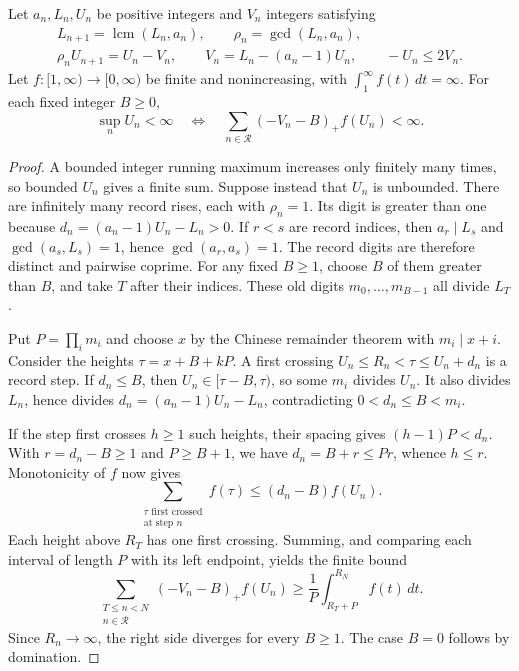 \documentclass[11pt]{article}
\begin{document}
\begin{theorem}\label{long243:res:arithmeticrecord}
Let $a_n,L_n,U_n$ be positive integers and $V_n$ integers satisfying
\[
 \begin{gathered}
 L_{n+1}=\operatorname{lcm}(L_n,a_n),\qquad \rho_n=\gcd(L_n,a_n),\\
 \rho_nU_{n+1}=U_n-V_n,\qquad
 V_n=L_n-(a_n-1)U_n,\qquad -U_n\le2V_n.
 \end{gathered}
\]
Let $f:[1,\infty)\to[0,\infty)$ be finite and nonincreasing, with
$\int_1^\infty f(t)\,dt=\infty$. For each fixed integer $B\ge0$,
\[
 \sup_n U_n<\infty
 \quad\Longleftrightarrow\quad
 \sum_{n\in\mathcal R}(-V_n-B)_+f(U_n)<\infty.
\]
\end{theorem}

\begin{proof}
A bounded integer running maximum increases only finitely many times, so
bounded $U_n$ gives a finite sum. Suppose instead that $U_n$ is unbounded.
There are infinitely many record rises, each with $\rho_n=1$. Its digit is
greater than one because $d_n=(a_n-1)U_n-L_n>0$. If $r<s$ are record
indices, then $a_r\mid L_s$ and $\gcd(a_s,L_s)=1$, hence
$\gcd(a_r,a_s)=1$. The record digits are therefore distinct and pairwise
coprime. For any fixed $B\ge1$, choose $B$ of them greater than $B$,
and take $T$ after their indices. These old digits
$m_0,\ldots,m_{B-1}$ all divide $L_T$.

Put $P=\prod_i m_i$ and choose $x$ by the Chinese remainder theorem with
$m_i\mid x+i$. Consider the heights $\tau=x+B+kP$. A first crossing
$U_n\le R_n<\tau\le U_n+d_n$ is a record step. If $d_n\le B$, then
$U_n\in[\tau-B,\tau)$, so some $m_i$ divides $U_n$. It also divides
$L_n$, hence divides $d_n=(a_n-1)U_n-L_n$, contradicting
$0<d_n\le B<m_i$.

If the step first crosses $h\ge1$ such heights, their spacing gives
$(h-1)P<d_n$. With $r=d_n-B\ge1$ and $P\ge B+1$, we have
$d_n=B+r\le Pr$, whence $h\le r$. Monotonicity of $f$ now gives
\[
 \sum_{\substack{\tau\text{ first crossed}\\\text{at step }n}}f(\tau)
 \le(d_n-B)f(U_n).
\]
Each height above $R_T$ has one first crossing. Summing, and comparing each
interval of length $P$ with its left endpoint, yields the finite bound
\begin{equation}\label{long243:eq:weightedcrossing}
 \sum_{\substack{T\le n<N\\n\in\mathcal R}}(-V_n-B)_+f(U_n)
 \ge\frac1P\int_{R_T+P}^{R_N} f(t)\,dt.
\end{equation}
Since $R_n\to\infty$, the right side diverges for every $B\ge1$.
The case $B=0$ follows by domination.
\end{proof}
\end{document}
